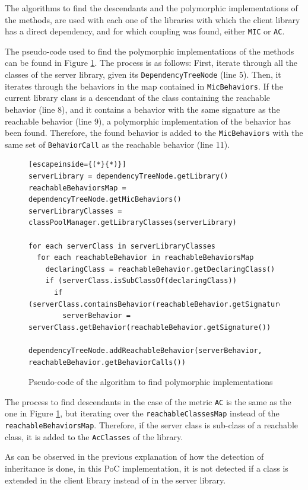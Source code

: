 The algorithms to find the descendants and the polymorphic implementations of the methods, are used with each one of the libraries with which the client library has a direct dependency, and for which coupling was found, either \texttt{MIC} or \texttt{AC}.

The pseudo-code used to find the polymorphic implementations of the methods can be found in Figure \ref{fig:algorithm-polymorphy}. The process is as follows: First, iterate through all the classes of the server library, given its \texttt{DependencyTreeNode} (line 5). Then, it iterates through the behaviors in the map contained in \texttt{MicBehaviors}. If the current library class is a descendant of the class containing the reachable behavior (line 8), and it contains a behavior with the same signature as the reachable behavior (line 9), a polymorphic implementation of the behavior has been found. Therefore, the found behavior is added to the \texttt{MicBehaviors} with the same set of \texttt{BehaviorCall} as the reachable behavior (line 11).

\begin{figure}[ht!]
\begin{lstlisting}[escapeinside={(*}{*)}]
serverLibrary = dependencyTreeNode.getLibrary()
reachableBehaviorsMap = dependencyTreeNode.getMicBehaviors()
serverLibraryClasses = classPoolManager.getLibraryClasses(serverLibrary)

for each serverClass in serverLibraryClasses
  for each reachableBehavior in reachableBehaviorsMap
    declaringClass = reachableBehavior.getDeclaringClass()
    if (serverClass.isSubClassOf(declaringClass))
      if (serverClass.containsBehavior(reachableBehavior.getSignature()))
        serverBehavior = serverClass.getBehavior(reachableBehavior.getSignature())
        dependencyTreeNode.addReachableBehavior(serverBehavior, reachableBehavior.getBehaviorCalls())
\end{lstlisting}
\caption{Pseudo-code of the algorithm to find polymorphic implementations}
\label{fig:algorithm-polymorphy}
\end{figure}

The process to find descendants in the case of the metric \texttt{AC} is the same as the one in Figure \ref{fig:algorithm-polymorphy}, but iterating over the \texttt{reachableClassesMap} instead of the \texttt{reachableBehaviorsMap}. Therefore, if the server class is sub-class of a reachable class, it is added to the \texttt{AcClasses} of the library.

\blankl
As can be observed in the previous explanation of how the detection of inheritance is done, in this PoC implementation, it is not detected if a class is extended in the client library instead of in the server library.

